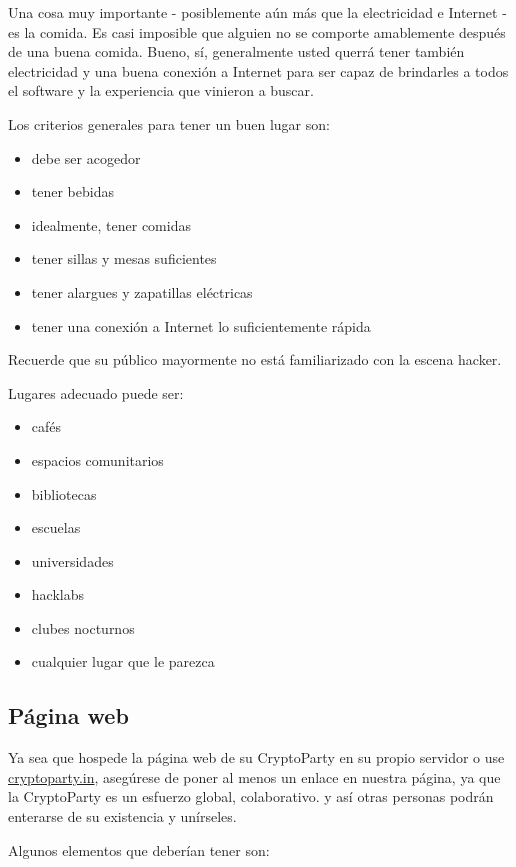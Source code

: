 \documentclass[10pt,a5paper,twoside,,]{book}
\providecommand{\tightlist}{%
  \setlength{\itemsep}{0pt}\setlength{\parskip}{0pt}}
\begin{document}
Una cosa muy importante - posiblemente aún más que la electricidad e
Internet - es la comida. Es casi imposible que alguien no se comporte
amablemente después de una buena comida. Bueno, sí, generalmente usted
querrá tener también electricidad y una buena conexión a Internet para
ser capaz de brindarles a todos el software y la experiencia que
vinieron a buscar.

Los criterios generales para tener un buen lugar son:

\begin{itemize}
\tightlist
\item
  debe ser acogedor
\item
  tener bebidas
\item
  idealmente, tener comidas
\item
  tener sillas y mesas suficientes
\item
  tener alargues y zapatillas eléctricas
\item
  tener una conexión a Internet lo suficientemente rápida
\end{itemize}

Recuerde que su público mayormente no está familiarizado con la escena
hacker.

Lugares adecuado puede ser:

\begin{itemize}
\tightlist
\item
  cafés
\item
  espacios comunitarios
\item
  bibliotecas
\item
  escuelas
\item
  universidades
\item
  hacklabs
\item
  clubes nocturnos
\item
  cualquier lugar que le parezca
\end{itemize}

\subsection{Página web}\label{puxe1gina-web}

Ya sea que hospede la página web de su CryptoParty en su propio servidor
o use \href{https://cryptoparty.in}{cryptoparty.in}, asegúrese de poner
al menos un enlace en nuestra página, ya que la CryptoParty es un
esfuerzo global, colaborativo. y así otras personas podrán enterarse de
su existencia y unírseles.

Algunos elementos que deberían tener son:
\end{document}
